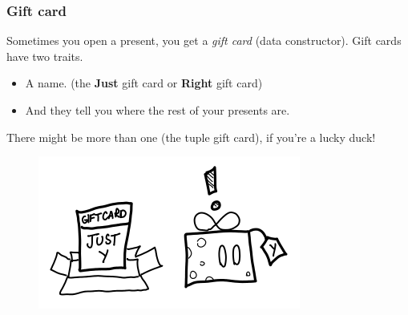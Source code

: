 \documentclass{beamer}
\begin{document}

\begin{frame}
\frametitle{Gift card}
Sometimes you open a present, you get a \textit{gift card} (data constructor).\newline
Gift cards have two traits.\newline
\begin{itemize}
    \item A name. (the \textbf{Just} gift card or \textbf{Right} gift card)\newline
    \item And they tell you where the rest of your presents are.\newline
\end{itemize}
There might be more than one (the tuple gift card), if you’re a lucky duck!
\begin{figure}[hbt!]
    \centering
    \includegraphics[height=0.4\textheight]{./pic/thunk-constructor.png}
\end{figure}
\end{frame}
\end{document}
